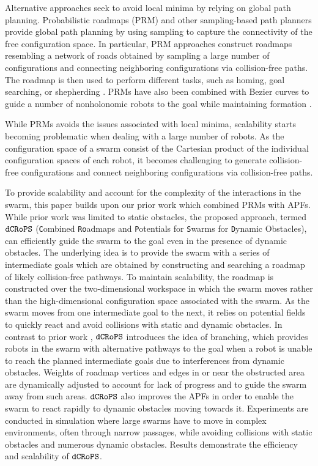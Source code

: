 \documentclass[letterpaper, 10pt, conference]{ieeeconf}
\newcommand{\Acronym}[1]{\ensuremath{{\small{\texttt{#1}}}}}
\newcommand{\Name}{\Acronym{dCRoPS}}
\begin{document}
Alternative approaches seek to avoid local minima by relying on global
path planning. Probabilistic roadmaps (PRM) \cite{PRM} and other
sampling-based path planners
\cite{RRT,RRTRecent1,TogglePRM,UOBPRM,PlakuTRO10} provide global path
planning by using sampling to capture the connectivity of the free
configuration space. In particular, PRM approaches construct roadmaps
resembling a network of roads obtained by sampling a large number of
configurations and connecting neighboring configurations via
collision-free paths.  The roadmap is then used to perform different
tasks, such as homing, goal searching, or shepherding
\cite{LienSwarming,LienShepherding}.  PRMs have also been combined
with Bezier curves to guide a number of nonholonomic robots to the
goal while maintaining formation \cite{KostasSwarm}.

While PRMs avoids the issues associated with local minima, scalability
starts becoming problematic when dealing with a large number of
robots. As the configuration space of a swarm consist of the Cartesian
product of the individual configuration spaces of each robot, it
becomes challenging to generate collision-free configurations and
connect neighboring configurations via collision-free paths. 
 
To provide scalability and account for the complexity of the
interactions in the swarm, this paper builds upon our prior work
\cite{PlakuTAROS13boids} which combined PRMs with APFs. While prior
work was limited to static obstacles, the proposed approach, termed
$\Name$ (\texttt{C}ombined \texttt{Ro}admaps and \texttt{P}otentials
for \texttt{S}warms for \texttt{D}ynamic Obstacles), can efficiently
guide the swarm to the goal even in the presence of dynamic obstacles.
The underlying idea is to provide the swarm with a series of
intermediate goals which are obtained by constructing and searching a
roadmap of likely collision-free pathways. To maintain scalability,
the roadmap is constructed over the two-dimensional workspace in which
the swarm moves rather than the high-dimensional configuration space
associated with the swarm. As the swarm moves from one intermediate
goal to the next, it relies on potential fields to quickly react and
avoid collisions with static and dynamic obstacles. In contrast to
prior work \cite{PlakuTAROS13boids}, $\Name$ introduces the idea of
branching, which provides robots in the swarm with alternative
pathways to the goal when a robot  is
unable to reach the planned intermediate goals due to interferences
from dynamic obstacles. Weights of roadmap vertices and
edges in or near the obstructed area are dynamically adjusted to
account for lack of progress and to guide the swarm away from such
areas. $\Name$ also improves the APFs in order to enable the swarm to
react rapidly to dynamic obstacles moving towards it.
Experiments are conducted in simulation where large
swarms have to move in complex environments, often through narrow
passages, while avoiding collisions with static obstacles and numerous
dynamic obstacles. Results demonstrate the efficiency and scalability
of $\Name$.
\end{document}
